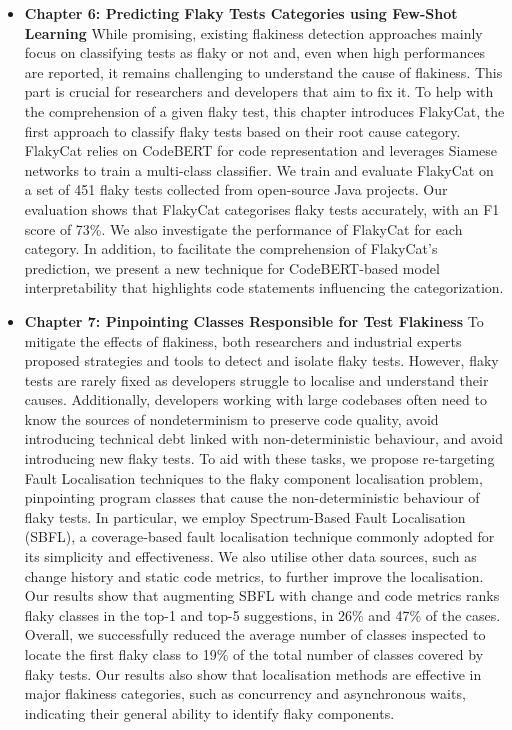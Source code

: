 \begin{itemize}
    \item \textbf{Chapter 6: Predicting Flaky Tests Categories using Few-Shot Learning} While promising, existing flakiness detection approaches mainly focus on classifying tests as flaky or not and, even when high performances are reported, it remains challenging to understand the cause of flakiness. This part is crucial for researchers and developers that aim to fix it. To help with the comprehension of a given flaky test, this chapter introduces FlakyCat, the first approach to classify flaky tests based on their root cause category. FlakyCat relies on CodeBERT for code representation and leverages Siamese networks to train a multi-class classifier. We train and evaluate FlakyCat on a set of 451 flaky tests collected from open-source Java projects. Our evaluation shows that FlakyCat categorises flaky tests accurately, with an F1 score of 73\%. We also investigate the performance of FlakyCat for each category. In addition, to facilitate the comprehension of FlakyCat's prediction, we present a new technique for CodeBERT-based model interpretability that highlights code statements influencing the categorization.\\
    
    \item \textbf{Chapter 7: Pinpointing Classes Responsible for Test Flakiness} To mitigate the effects of flakiness, both researchers and industrial experts proposed strategies and tools to detect and isolate flaky tests. However, flaky tests are rarely fixed as developers struggle to localise and understand their causes. Additionally, developers working with large codebases often need to know the sources of nondeterminism to preserve code quality, \ie avoid introducing technical debt linked with non-deterministic behaviour, and avoid introducing new flaky tests. To aid with these tasks, we propose re-targeting Fault Localisation techniques to the flaky component localisation problem, \ie pinpointing program classes that cause the non-deterministic behaviour of flaky tests. In particular, we employ Spectrum-Based Fault Localisation (SBFL), a coverage-based fault localisation technique commonly adopted for its simplicity and effectiveness. We also utilise other data sources, such as change history and static code metrics, to further improve the localisation. Our results show that augmenting SBFL with change and code metrics ranks flaky classes in the top-1 and top-5 suggestions, in 26\% and 47\% of the cases. Overall, we successfully reduced the average number of classes inspected to locate the first flaky class to 19\% of the total number of classes covered by flaky tests. Our results also show that localisation methods are effective in major flakiness categories, such as concurrency and asynchronous waits, indicating their general ability to identify flaky components.\\
    

\end{itemize}
